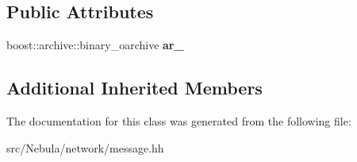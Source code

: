 \subsection*{Public Attributes}
\begin{DoxyCompactItemize}
\item 
\hypertarget{classgal_1_1network_1_1omessage_a9de736888b2431c56c24e7229e300722}{boost\-::archive\-::binary\-\_\-oarchive {\bfseries ar\-\_\-}}\label{classgal_1_1network_1_1omessage_a9de736888b2431c56c24e7229e300722}

\end{DoxyCompactItemize}
\subsection*{Additional Inherited Members}


The documentation for this class was generated from the following file\-:\begin{DoxyCompactItemize}
\item 
src/\-Nebula/network/message.\-hh\end{DoxyCompactItemize}

